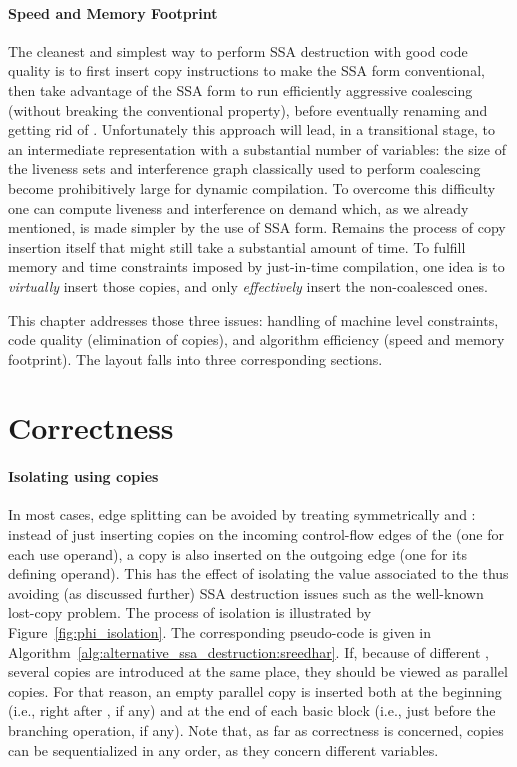 \paragraph{Speed and Memory Footprint}
The cleanest and simplest way to perform SSA destruction with good code quality is to first insert copy instructions to make the SSA form conventional, then take advantage of the SSA form to run efficiently aggressive coalescing (without breaking the conventional property), before eventually renaming \phiwebs\index{\phiweb} and getting rid of \phifuns. 
Unfortunately this approach will lead, in a transitional stage, to an intermediate representation with a substantial number of variables: 
the size of the liveness sets and interference graph classically used to perform coalescing become prohibitively large for dynamic compilation. 
To overcome this difficulty one can compute liveness and interference on demand which, as we already mentioned, is made simpler by the use of SSA form. 
Remains the process of copy insertion itself that might still take a substantial amount of time. 
To fulfill memory and time constraints imposed by just-in-time compilation, one idea is to \emph{virtually} insert those copies, and only \emph{effectively} insert the non-coalesced ones.

This chapter addresses those three issues: 
handling of machine level constraints, code quality (elimination of copies), and algorithm efficiency (speed and memory footprint). 
The layout falls into three corresponding sections.

\section{Correctness}

\paragraph{Isolating \phinode using copies}
In most cases, edge splitting can be avoided by treating symmetrically \phiuses and \phidef: 
instead of just inserting copies on the incoming control-flow edges of the \phinode (one for each use operand), a copy is also inserted on the outgoing edge (one for its defining operand). 
This has the effect of isolating the value associated to the \phinode thus avoiding (as discussed further) SSA destruction issues such as the well-known lost-copy problem. 
The process of \phinode isolation is illustrated by Figure~\ref{fig:phi_isolation}. 
The corresponding pseudo-code is given in Algorithm~\ref{alg:alternative_ssa_destruction:sreedhar}. 
If, because of different \phifuns, several copies are introduced at the same place, they should be viewed as parallel copies. 
For that reason, an empty parallel copy is inserted both at the beginning (i.e., right after \phifuns, if any) and at the end of each basic block (i.e., just before the branching operation, if any). 
Note that, as far as correctness is concerned, copies can be sequentialized in any order, as they concern different variables.

